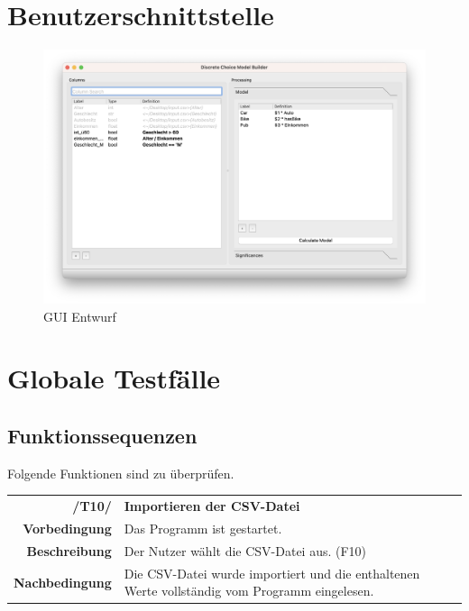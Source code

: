 \documentclass{article}
\begin{document}
\clearpage
\section{Benutzerschnittstelle}
\begin{figure}[H]%
  \centering
  \includegraphics[width=12cm]{specifications/img/gui-screenshots/columns+model.png}
  \caption{GUI Entwurf}
\end{figure}

\clearpage
\section{Globale Testfälle}

\subsection{Funktionssequenzen}
Folgende Funktionen sind zu überprüfen.

\begin{table}[H]
\begin{tabularx}{\textwidth}{rX}
\textbf{/T10/}         & \textbf{Importieren der CSV-Datei}                                                               \\
\textbf{Vorbedingung}  & Das Programm ist gestartet.                                                                \\
\textbf{Beschreibung}  & Der Nutzer wählt die CSV-Datei aus. (F10)                                \\
\textbf{Nachbedingung} & Die CSV-Datei wurde importiert und die enthaltenen Werte vollständig vom Programm eingelesen.
\end{tabularx}
\end{table}
\end{document}
